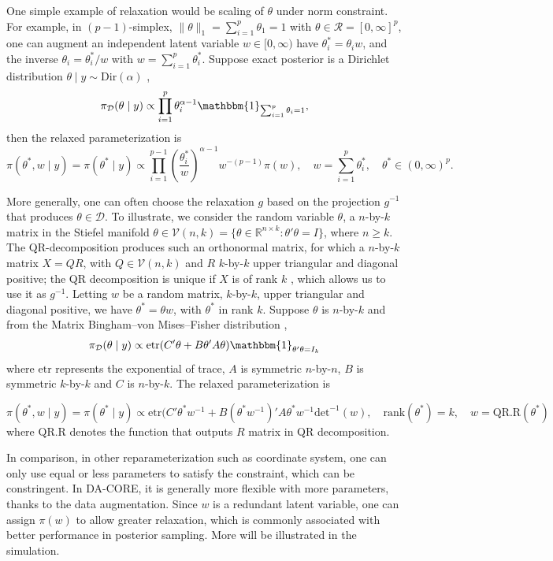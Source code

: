 \documentclass[10pt,fleqn]{article}
\newcommand{\bb}[1]{\mathbb{#1}}
\newcommand{\mc}[1]{\mathcal{#1}}
\DeclareMathOperator{\1}{\mathbbm{1}}
\begin{document}
One simple example of relaxation would be scaling of $\theta$ under  norm constraint. For example, in $(p-1)$-simplex,
$\|\theta\|_1=\sum_{i=1}^p\theta_1=1$ with $\theta\in \mc R=[0,\infty]^p$, one
can augment an independent latent variable $w\in [0,\infty)$ have
$\theta_i^*=\theta_i w$, and the inverse $\theta_i=\theta_i^*/w$ with
$w=\sum_{i=1}^p \theta^*_i$. Suppose exact posterior is a Dirichlet distribution 
$\theta\mid y\sim \text{Dir}(\alpha)$
, 
$$
\pi_{\mc D}(\theta \mid y)\propto \prod_{i=1}^p \theta_i^{\alpha-1}\mathbbm{1}_{\sum_{i=1}^p\theta_i=1},$$
then the relaxed parameterization is $$
\pi(\theta^*,w\mid y) =\pi(\theta^*\mid y)\propto  \prod_{i=1}^{p-1} (\frac{\theta_i^*}{w})^{\alpha-1}  w^{-(p-1)} \pi(w), \quad w=\sum_{i=1}^p \theta^*_i, \quad \theta^*\in(0,\infty)^p.$$

More generally, one can often choose the relaxation $g$ based on the projection $g^{-1}$ that produces $\theta\in \mc D$. To illustrate, we consider the random variable
$\theta$, a $n$-by-$k$ matrix in the Stiefel manifold $\theta\in \mc V(n,k)=\{\theta\in \bb R^{n\times
k}: \theta'\theta=I\}$, where $n\ge k$. The QR-decomposition produces such
an orthonormal matrix, for which a $n$-by-$k$ matrix $X=QR$,
with $Q\in \mc V(n,k)$ and $R$ $k$-by-$k$ upper triangular and diagonal positive;
 the
QR decomposition is unique if $X$ is of rank $k$ \citep{gulliksson1992modifying}, which allows us to
use it as $g^{-1}$. Letting $w$ be a random matrix, $k$-by-$k$, upper triangular and diagonal positive, we have $\theta^*=\theta w$, with $\theta^*$ in rank
$k$. Suppose $\theta$ is $n$-by-$k$ and from the Matrix Bingham--von Mises--Fisher distribution
\citep{hoff2009simulation},
$$\pi_{\mc D}(\theta\mid y)\propto \text{etr}(C'\theta+B\theta'A\theta)  \mathbbm{1}_{\theta'\theta=I_k}$$
where $\text{etr}$ represents the exponential of trace, $A$ is symmetric $n$-by-$n$, $B$ is symmetric $k$-by-$k$ and $C$ is $n$-by-$k$. The relaxed
parameterization is

$$\pi(\theta^*, w\mid y) =\pi(\theta^*\mid y)\propto \text{etr}(C'\theta^*w^{-1}+B(\theta^*w^{-1})'A\theta^*w^{-1} \text{det}^{-1}(w), \quad \text{rank}(\theta^*)=k, \quad w= \text{QR.R}(\theta^*)$$
where $\text{QR.R}$ denotes the function that outputs $R$ matrix in QR decomposition.

In comparison, in other reparameterization such as coordinate system, one can only use equal or less parameters to satisfy the constraint, which can
be  constringent. In DA-CORE, it is generally
more flexible with more parameters, thanks to the data augmentation. Since $w$ is a redundant latent variable, one can
assign $\pi(w)$ to allow greater relaxation, which is commonly associated
with better performance in posterior sampling. More will be illustrated in
the simulation.
\end{document}
